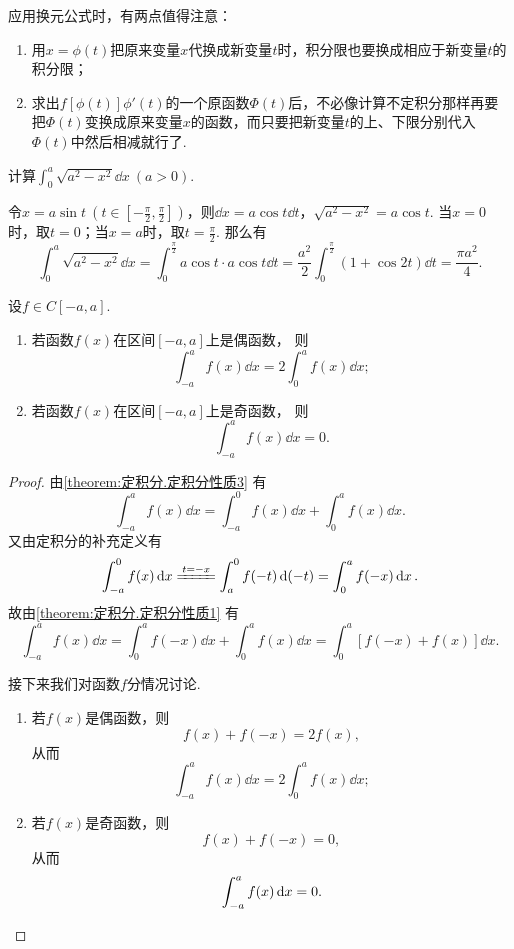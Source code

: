 应用换元公式时，有两点值得注意：\begin{enumerate}
\item 用\(x = \phi(t)\)把原来变量\(x\)代换成新变量\(t\)时，积分限也要换成相应于新变量\(t\)的积分限；
\item 求出\(f[\phi(t)] \phi'(t)\)的一个原函数\(\Phi(t)\)后，不必像计算不定积分那样再要把\(\Phi(t)\)变换成原来变量\(x\)的函数，而只要把新变量\(t\)的上、下限分别代入\(\Phi(t)\)中然后相减就行了.
\end{enumerate}

\begin{example}
计算\(\int_0^a{\sqrt{a^2-x^2} \dd{x}}\ (a > 0)\).
\begin{solution}
令\(x = a \sin t\ (t \in [-\frac{\pi}{2},\frac{\pi}{2}])\)，则\(\dd{x} = a \cos t \dd{t}\)，\(\sqrt{a^2-x^2} = a \cos t\).
当\(x = 0\)时，取\(t = 0\)；当\(x = a\)时，取\(t = \frac{\pi}{2}\).
那么有\[
\int_0^a{\sqrt{a^2-x^2} \dd{x}}
= \int_0^{\frac{\pi}{2}}{a \cos t \cdot a \cos t \dd{t}}
= \frac{a^2}{2} \int_0^{\frac{\pi}{2}}{(1+\cos 2 t) \dd{t}}
= \frac{\pi a^2}{4}.
\]
\end{solution}
\end{example}

\begin{proposition}\label{theorem:定积分.利用对称性简化计算1}
设\(f \in C[-a,a]\).
\begin{enumerate}
	\item 若函数\(f(x)\)在区间\([-a,a]\)上是偶函数，
	则\[
		\int_{-a}^a f(x) \dd{x}
		= 2 \int_0^a f(x) \dd{x};
	\]

	\item 若函数\(f(x)\)在区间\([-a,a]\)上是奇函数，
	则\[
		\int_{-a}^a f(x) \dd{x} = 0.
	\]
\end{enumerate}
\begin{proof}
由\cref{theorem:定积分.定积分性质3} 有\[
	\int_{-a}^a f(x) \dd{x}
	= \int_{-a}^0 f(x) \dd{x} + \int_0^a f(x) \dd{x}.
\]
又由定积分的补充定义有\[
	\int_{-a}^0 f(x) \dd{x}
	\xlongequal{t=-x} \int_a^0 f(-t) \dd(-t)
	= \int_0^a f(-x) \dd{x}.
\]
故由\cref{theorem:定积分.定积分性质1} 有\[
	\int_{-a}^a f(x) \dd{x}
	= \int_0^a f(-x) \dd{x} + \int_0^a f(x) \dd{x}
	= \int_0^a [f(-x) + f(x)] \dd{x}.
\]

接下来我们对函数\(f\)分情况讨论.
\begin{enumerate}
	\item 若\(f(x)\)是偶函数，则\[
		f(x) + f(-x) = 2 f(x),
	\]
	从而\[
		\int_{-a}^a f(x) \dd{x} = 2 \int_0^a f(x) \dd{x};
	\]

	\item 若\(f(x)\)是奇函数，则\[
		f(x) + f(-x) = 0,
	\]
	从而\[
		\int_{-a}^a f(x) \dd{x} = 0.
		\qedhere
	\]
\end{enumerate}
\end{proof}
\end{proposition}

